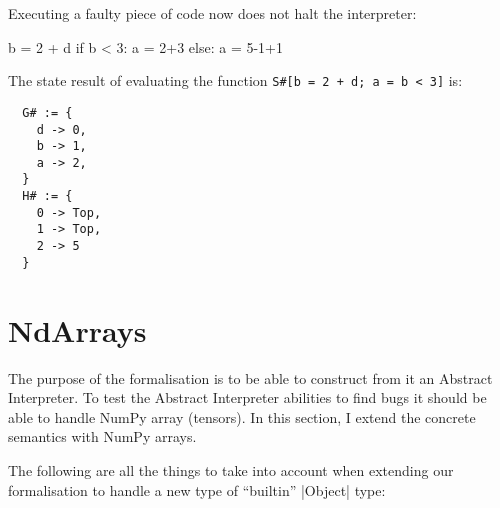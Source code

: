 Executing a faulty piece of code now does not halt the interpreter:

\begin{pythoncode}
b = 2 + d
if b < 3:
  a = 2+3
else:
  a = 5-1+1
\end{pythoncode}

The state result of evaluating the function \verb|S#[b = 2 + d; a = b < 3]| is:

\begin{verbatim}
  G# := {
    d -> 0,
    b -> 1,
    a -> 2,
  }
  H# := {
    0 -> Top,
    1 -> Top,
    2 -> 5
  }
\end{verbatim}

\section{NdArrays}

The purpose of the formalisation is to be able to construct from it an Abstract
Interpreter. To test the Abstract Interpreter abilities to find bugs it should be able to
handle NumPy array (tensors). In this section, I extend the concrete semantics with NumPy
arrays.

The following are all the things to take into account when extending our formalisation to
handle a new type of \enquote{builtin} \pycode|Object| type:

